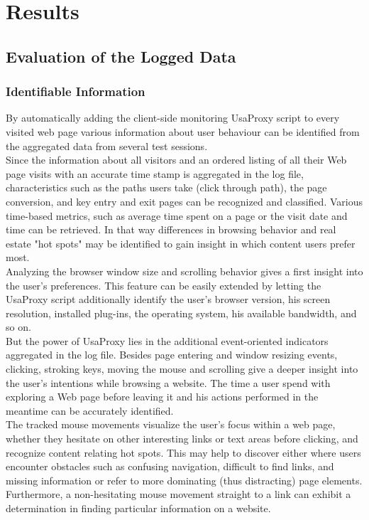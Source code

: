 \section{Results}

\subsection{Evaluation of the Logged Data}

\subsubsection{Identifiable Information}
By automatically adding the client-side monitoring UsaProxy script to every visited web page various information about user behaviour can be identified from the aggregated data from several test sessions.\\

Since the information about all visitors and an ordered listing of all their Web page visits with an accurate time stamp is aggregated in the log file, characteristics such as the paths users take (click through path), the page conversion, and key entry and exit pages can be recognized and classified. Various time-based metrics, such as average time spent on a page or the visit date and time can be retrieved. In that way differences in browsing behavior and real estate "hot spots" may be identified to gain insight in which content users prefer most. \\

Analyzing the browser window size and scrolling behavior gives a first insight into the user's preferences. This feature can be easily extended by letting the UsaProxy script additionally identify the user's browser version, his screen resolution, installed plug-ins, the operating system, his available bandwidth, and so on.\\

But the power of UsaProxy lies in the additional event-oriented indicators aggregated in the log file. Besides page entering and window resizing events, clicking, stroking keys, moving the mouse and scrolling give a deeper insight into the user's intentions while browsing a website. The time a user spend with exploring a Web page before leaving it and his actions performed in the meantime can be accurately identified.\\

The tracked mouse movements visualize the user's focus within a web page, whether they hesitate on other interesting links or text areas before clicking, and recognize content relating hot spots.
This may help to discover either where users encounter obstacles such as confusing navigation, difficult to find links, and missing information or refer to more dominating (thus distracting) page elements. Furthermore, a non-hesitating mouse movement straight to a link can exhibit a determination in finding particular information on a website. \\

